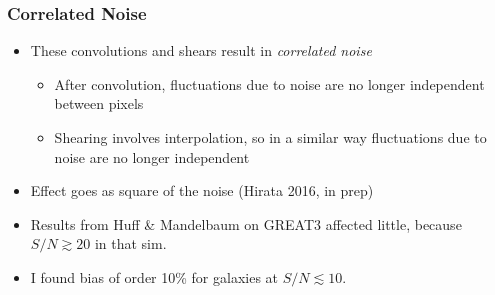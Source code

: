\documentclass{beamer}
\begin{document}
\frame
{
    \frametitle{Correlated Noise}

 
    \begin{itemize}

        \item These convolutions and shears result in {\em {\color{brightred} correlated noise}}
            
        \begin{itemize}
            \item After convolution, fluctuations due to noise are no longer
                independent between pixels

            \item Shearing involves interpolation, so in a similar way fluctuations
                due to noise are no longer independent
        \end{itemize}

    \item Effect goes as {\color{orange} square} of the noise (Hirata 2016, in prep)

        \item Results from Huff \& Mandelbaum on GREAT3 affected little, because
            $S/N \gtrsim 20$ in that sim.

        \item I found bias of order 10\% for galaxies at $S/N \lesssim 10$.



    \end{itemize}

}


%
%
%
%
\end{document}
